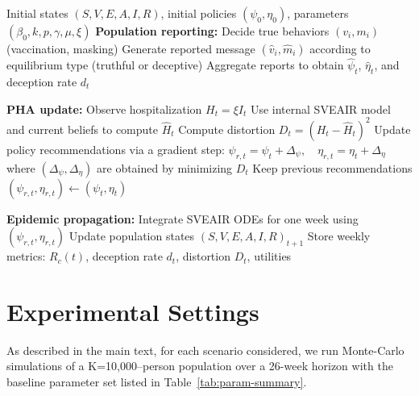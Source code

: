 \documentclass[sigconf,review]{acmart}
\begin{document}
\begin{table}[t]
\centering
\begin{minipage}{\textwidth}
\begin{algorithm}[H]
\caption{Weekly Interactive Loop Between Population and PHA}
\label{alg:weekly_loop}
\begin{algorithmic}[1]
\Require Initial states $(S,V,E,A,I,R)$, initial policies $(\psi_0,\eta_0)$, parameters $(\beta_0,k,p,\gamma,\mu,\xi)$
    \State \textbf{Population reporting:}
        \State Decide true behaviors $(v_i, m_i)$ (vaccination, masking)
        \State Generate reported message $(\hat{v}_i, \hat{m}_i)$ according to equilibrium type (truthful or deceptive)
    \EndFor
    \State Aggregate reports to obtain $\hat{\psi}_t$, $\hat{\eta}_t$, and deception rate $d_t$
    \Statex

    \State \textbf{PHA update:}
    \State Observe hospitalization $H_t = \xi I_t$
    \State Use internal SVEAIR model and current beliefs to compute $\hat{H}_t$
    \State Compute distortion $D_t = (H_t - \hat{H}_t)^2$
        \State Update policy recommendations via a gradient step:
        \Statex\hspace{1.2em}$\psi_{r,t} = \psi_t + \Delta_\psi,\quad \eta_{r,t} = \eta_t + \Delta_\eta$
        \State where $(\Delta_\psi,\Delta_\eta)$ are obtained by minimizing $D_t$
    \Else
        \State Keep previous recommendations $(\psi_{r,t}, \eta_{r,t}) \gets (\psi_t, \eta_t)$
    \EndIf
    \Statex

    \State \textbf{Epidemic propagation:}
    \State Integrate SVEAIR ODEs for one week using $(\psi_{r,t}, \eta_{r,t})$
    \State Update population states $(S,V,E,A,I,R)_{t+1}$
    \State Store weekly metrics: $R_c(t)$, deception rate $d_t$, distortion $D_t$, utilities
\EndFor
\end{algorithmic}
\end{algorithm}
\end{minipage}
\end{table}


\section{Experimental Settings}
\label{supp:settings}
As described in the main text, for each scenario considered, we run Monte-Carlo simulations of a K=10{,}000–person population over a 26-week horizon with the baseline parameter set listed in Table~\ref{tab:param-summary}. 
\end{document}
